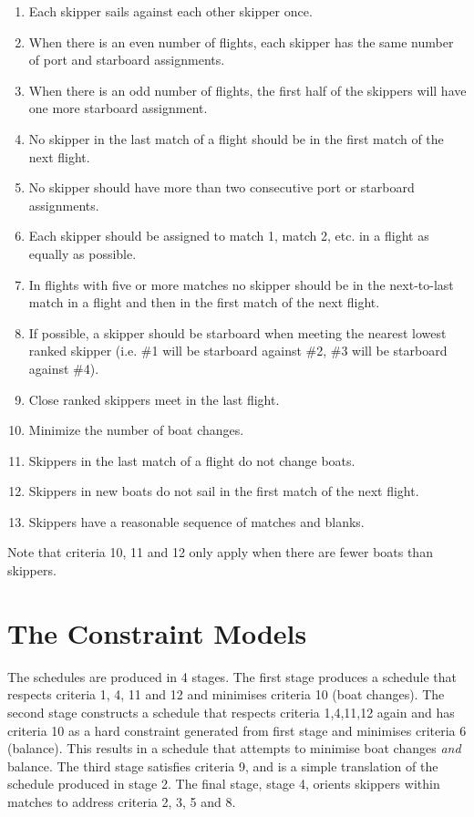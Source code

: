 \documentclass{llncs}
\begin{document}
\begin{enumerate}
\item Each skipper sails against each other skipper once.
\item When there is an even number of flights, each skipper has the same number
    of port and starboard assignments.
\item When there is an odd number of flights, the first half of the skippers
    will have one more starboard assignment.
\item No skipper in the last match of a flight should be in the first match of
    the next flight.
\item No skipper should have more than two consecutive port or starboard
    assignments.
\item Each skipper should be assigned to match 1, match 2, etc. in a flight as
    equally as possible.
\item In flights with five or more matches no skipper should be in the
    next-to-last match in a flight and then in the first match of the next
    flight.
\item If possible, a skipper should be starboard when meeting the nearest
    lowest ranked skipper (i.e. \#1 will be starboard against \#2, \#3 will be
    starboard against \#4).
\item Close ranked skippers meet in the last flight.
\item Minimize the number of boat changes.
\item Skippers in the last match of a flight do not change boats.
\item Skippers in new boats do not sail in the first match of the next flight.
\item Skippers have a reasonable sequence of matches and blanks.
\end{enumerate}

Note that criteria 10, 11 and 12 only apply when there are fewer boats than
skippers.

\section{The Constraint Models}

The schedules are produced in 4 stages. The first stage produces a schedule
that respects criteria 1, 4, 11 and 12 and minimises criteria 10 (boat
changes). The second stage constructs a schedule that respects criteria
1,4,11,12 again and has criteria 10 as a hard constraint generated from first
stage and minimises criteria 6 (balance). This results in a schedule that
attempts to minimise boat changes \emph{and} balance. The third stage satisfies
criteria 9, and is a simple translation of the schedule produced in stage 2.
The final stage, stage 4, orients skippers within matches to address criteria
2, 3, 5 and 8. 
\end{document}
